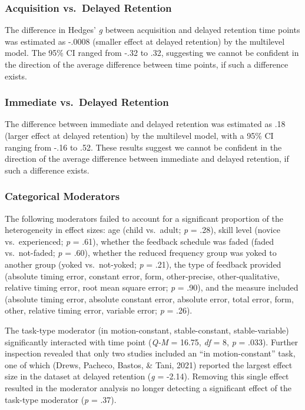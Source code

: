 \documentclass[
  english,
  man, donotrepeattitle,floatsintext]{apa7}
\begin{document}
\hypertarget{acquisition-vs.-delayed-retention}{%
\subsubsection{Acquisition vs.~Delayed Retention}\label{acquisition-vs.-delayed-retention}}

The difference in Hedges' \emph{g} between acquisition and delayed retention time points was estimated as -.0008 (smaller effect at delayed retention) by the multilevel model. The 95\% CI ranged from -.32 to .32, suggesting we cannot be confident in the direction of the average difference between time points, if such a difference exists.

\hypertarget{immediate-vs.-delayed-retention}{%
\subsubsection{Immediate vs.~Delayed Retention}\label{immediate-vs.-delayed-retention}}

The difference between immediate and delayed retention was estimated as .18 (larger effect at delayed retention) by the multilevel model, with a 95\% CI ranging from -.16 to .52. These results suggest we cannot be confident in the direction of the average difference between immediate and delayed retention, if such a difference exists.

\hypertarget{categorical-moderators}{%
\subsubsection{Categorical Moderators}\label{categorical-moderators}}

The following moderators failed to account for a significant proportion of the heterogeneity in effect sizes: age (child vs.~adult; \emph{p} = .28), skill level (novice vs.~experienced; \emph{p} = .61), whether the feedback schedule was faded (faded vs.~not-faded; \emph{p} = .60), whether the reduced frequency group was yoked to another group (yoked vs.~not-yoked; \emph{p} = .21), the type of feedback provided (absolute timing error, constant error, form, other-precise, other-qualitative, relative timing error, root mean square error; \emph{p} = .90), and the measure included (absolute timing error, absolute constant error, absolute error, total error, form, other, relative timing error, variable error; \emph{p} = .26).

The task-type moderator (in motion-constant, stable-constant, stable-variable) significantly interacted with time point (\emph{Q-M} = 16.75, \emph{df} = 8, \emph{p} = .033). Further inspection revealed that only two studies included an ``in motion-constant'' task, one of which (Drews, Pacheco, Bastos, \& Tani, 2021) reported the largest effect size in the dataset at delayed retention (\emph{g} = -2.14). Removing this single effect resulted in the moderator analysis no longer detecting a significant effect of the task-type moderator (\emph{p} = .37).
\end{document}
